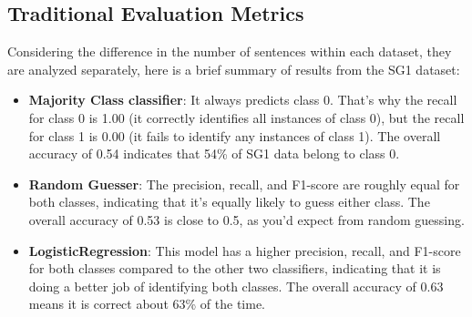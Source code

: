 \documentclass[11pt,a4paper]{article}
\begin{document}
\subsection{Traditional Evaluation Metrics}
Considering the difference in the number of sentences within each dataset, they are analyzed separately, here is a brief summary of results from the SG1 dataset:
\begin{itemize}
    \item \textbf{Majority Class classifier}: It always predicts class 0. That’s why the recall for class 0 is 1.00 (it correctly identifies all instances of class 0), but the recall for class 1 is 0.00 (it fails to identify any instances of class 1). The overall accuracy of 0.54 indicates that 54\% of SG1 data belong to class 0.
    \item \textbf{Random Guesser}:  The precision, recall, and F1-score are roughly equal for both classes, indicating that it’s equally likely to guess either class. The overall accuracy of 0.53 is close to 0.5, as you’d expect from random guessing. 
    \item \textbf{LogisticRegression}: This model has a higher precision, recall, and F1-score for both classes compared to the other two classifiers, indicating that it is doing a better job of identifying both classes. The overall accuracy of 0.63 means it is correct about 63\% of the time.
\end{itemize}
\end{document}

